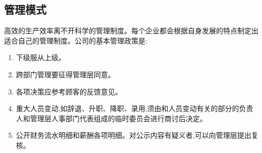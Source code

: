 \subsection{管理模式}
高效的生产效率离不开科学的管理制度。每个企业都会根据自身发展的特点制定出
适合自己的管理制度。公司的基本管理政策是:
\begin{enumerate}
\item 下级服从上级。
\item 跨部门管理要征得管理层同意。
\item 各项决策应参考顾客的反馈意见。
\item 重大人员变动,如辞退、升职、降职、录用,须由和人员变动有关的部分的负责
        人和管理层人事部门代表组成的临时委员会进行商讨后决定。
\item 公开财务流水明细和薪酬各项明细。对公示内容有疑义者,可以向管理层提出复核。
\end{enumerate}
